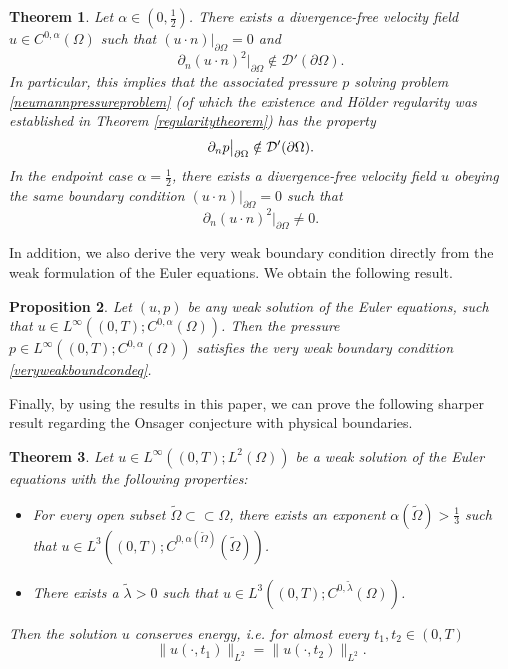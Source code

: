 \documentclass[12pt,a4paper]{article}
\newtheorem{theorem}{Theorem}[section]
\newtheorem{proposition}[theorem]{Proposition}
\theoremstyle{definition}
\theoremstyle{remark}
\numberwithin{equation}{section}
\begin{document}
\begin{theorem} \label{exampletheorem}
Let $\alpha \in \left(0,\frac{1}{2}\right)$. There exists a divergence-free velocity field $u \in C^{0,\alpha} (\Omega)$ such that $(u \cdot n) \lvert_{\partial \Omega} = 0$ and
\begin{equation}
\partial_n (u \cdot n)^2 \big\lvert_{\partial \Omega} \notin \mathcal{D}' (\partial \Omega).
\end{equation}
In particular, this implies that the associated pressure $p$ solving problem \eqref{neumannpressureproblem} (of which the existence and Hölder regularity was established in Theorem \ref{regularitytheorem}) has the property
\begin{equation}
\partial_n p \space \big\lvert_{\partial \Omega} \notin \mathcal{D}' (\partial \Omega).
\end{equation}
In the endpoint case $\alpha = \frac{1}{2}$, there exists a divergence-free velocity field $u$ obeying the same boundary condition $(u \cdot n ) \lvert_{\partial \Omega} = 0$ such that
\begin{equation}
\partial_n (u \cdot n)^2 \big\lvert_{\partial \Omega} \neq 0.
\end{equation}
\end{theorem}
In addition, we also derive the very weak boundary condition directly from the weak formulation of the Euler equations. We obtain the following result.
\begin{proposition} \label{weaksolutionproposition}
Let $(u,p)$ be any weak solution of the Euler equations, such that $u \in L^\infty ((0,T); C^{0,\alpha} (\Omega))$. Then the pressure $p \in L^\infty ((0,T); C^{0,\alpha} (\Omega))$ satisfies the very weak boundary condition \eqref{veryweakboundcondeq}.
\end{proposition}
Finally, by using the results in this paper, we can prove the following sharper result regarding the Onsager conjecture with physical boundaries.
\begin{theorem} \label{onsagerconjecture}
Let $u \in L^\infty ((0,T); L^2 (\Omega))$ be a weak solution of the Euler equations with the following properties:
\begin{itemize}
    \item For every open subset $\widetilde{\Omega} \subset \subset \Omega$, there exists an exponent $\alpha (\widetilde{\Omega}) > \frac{1}{3}$ such that $u \in L^3 ((0,T); C^{0,\alpha (\widetilde{\Omega})} (\widetilde{\Omega}))$.
    \item There exists a $\widetilde{\lambda} > 0$ such that $u \in L^3 ((0,T); C^{0,\widetilde{\lambda}} (\Omega))$.
\end{itemize}
Then the solution $u$ conserves energy, i.e. for almost every $t_1, t_2 \in (0,T)$
\begin{equation}
\lVert u(\cdot, t_1) \rVert_{L^2} = \lVert u (\cdot, t_2) \rVert_{L^2}.
\end{equation}
\end{theorem}
\end{document}
